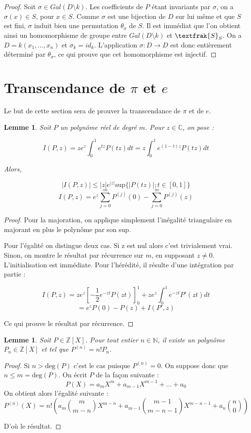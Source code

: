 \documentclass[12pt,a4paper]{report}
\newtheorem{lem}[thm]{\bf Lemme}
\begin{document}
\begin{proof}
Soit $\sigma \in Gal(D\setminus k)$. Les coefficients de $P$ étant invariants par $\sigma$, on a $\sigma(x) \in S$, pour $x\in S$. Comme $\sigma$ est une bijection de $D$ sur lui même et que $S$ est fini, $\sigma$ induit bien une permutation $\theta_{\sigma}$ de $S$. Il est immédiat que l'on obtient ainsi un homomorphisme de groupe entre $Gal(D\setminus k)$ et $\textfrak{S}_S$. On a $D=k(x_1,...,x_n)$ et $\sigma_k=id_k$. L'application $\sigma : D \rightarrow D$ est donc entièrement déterminé par $\theta_{\sigma}$, ce qui prouve que cet homomorphisme est injectif. 
\end{proof}

\section{Transcendance de $\pi$ et $e$}
Le but de cette section sera de prouver la transcendance de $\pi$ et de $e$. 


\begin{lem}\rm

Soit $P$ un polynôme réel de degré $m$. Pour $z\in \mathbb{C}$, on pose : 

$$I(P,z)=ze^{z}\int_{0}^{1} e^{tz}P(tz)dt=z\int_{0}^{1}e^{(1-t)z}P(tz)dt$$

Alors, 

$$\lvert I(P,z) \rvert \leq \lvert z \rvert e^{|z|}\text{sup}\{ \lvert P(tz) \rvert ; t \in [0,1]\}$$
$$I(P,z)= e^{z}\sum_{j=0}^{m} P^{(j)}(0)-\sum_{j=0}^{m} P^{(j)}(z)$$

\end{lem}
\begin{proof}
Pour la majoration, on applique simplement l'inégalité triangulaire en majorant en plus le polynôme par son sup. 

Pour l'égalité on distingue deux cas. Si z est nul alors c'est trivialement vrai. Sinon, on montre le résultat par récurrence sur $m$, en supposant $z\neq 0$. L'initialisation est immédiate. Pour l'hérédité, il résulte d'une intégration par partie : 

$$I(P,z)= ze^{z}\left[-\dfrac{1}{2}e^{-zt}P(zt)\right]^{1}_{0}+ze^{z}\int_{0}^{1}e^{-zt}P'(zt)dt$$
$$=e^{z}P(0)-P(z)+I(P',z)$$

Ce qui prouve le résultat par récurrence.

\end{proof}

\begin{lem}\rm
Soit $P \in \mathbb{Z}[X]$. Pour tout entier $n \in \mathbb{N}$, il existe un polynôme $P_{n} \in \mathbb{Z}[X]$ et tel que $P^{(n)}=n!P_{n}$. 

\end{lem}
\begin{proof}
Si $n>\text{deg}(P)$ c'est le cas puisque $P^{(n)}=0$. On suppose donc que $n\leq m= \text{deg}(P)$. On écrit $P$ de la façon suivante : 
$$P(X)=a_{m}X^{m}+a_{m-1}X^{m-1}+...+a_{0}$$
On obtient alors l'égalité suivante : 
$$P^{(n)}(X) = n!\left(a_{m} \binom{m}{m-n}X^{m-n}+a_{m-1} \binom{m-1}{m-n-1}X^{m-n-1}+a_{n}\binom{n}{0}\right)$$

D'où le résultat.
\end{proof}
\end{document}
